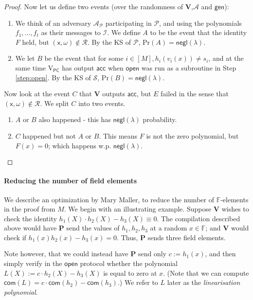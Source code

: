 \documentclass[11pt]{article} %
\newcommand{\F}{\ensuremath{\mathbb F}\xspace}
\newcommand{\adv}{\ensuremath{\mathcal A}\xspace}
\newcommand{\com}{\ensuremath{\mathsf{com}}\xspace}
\newcommand{\open}{\ensuremath{\mathsf{open}}\xspace}
\newcommand{\negl}{\ensuremath{\mathsf{negl}(\lambda)}\xspace}
\newcommand{\acc}{\ensuremath{\mathsf{acc}}\xspace}
\newcommand{\defeq}{:=}
\newcommand{\gen}{\ensuremath{\mathsf{gen}}\xspace}
\newcommand{\prv}{\ensuremath{\mathsf{\mathbf{P}}}\xspace}
\newcommand{\verpc}{\ensuremath{\mathrm{V_{\mathsf{PC}}}}\xspace}
\newcommand{\ideal}{\ensuremath{\mathcal{I}}\xspace}
\newcommand{\inp}{\ensuremath{\mathsf{x}}\xspace}
\newcommand{\wit}{\ensuremath{\omega}\xspace}
\newcommand{\ver}{\ensuremath{\mathsf{\mathbf{V}}}\xspace}
\newcommand{\rel}{\ensuremath{\mathcal{R}}\xspace}
\newcommand{\ext}{\ensuremath{E}\xspace}
\newcommand{\prot}{\ensuremath{\mathscr{P}}\xspace}
\newcommand{\PCscheme}{\ensuremath{\mathscr{S}}\xspace}
\newcommand{\prob}{\ensuremath{\mathrm{Pr}}\xspace}
\newcommand{\advprot}{\ensuremath{\mathcal A_{\prot}}\xspace}
\begin{document}
\begin{proof}
Now let us define two events (over the randomness of \ver,\adv and \gen):
\begin{enumerate}
 \item We think of an adversary \advprot participating in \prot, and using the polynomials $f_1,\ldots,f_t$ as their messages to \ideal. We define $A$ to be the event that the identity $F$ held, but $(\inp,\wit)\notin \rel$. By the KS of \prot, $\prob(A)=\negl$.
 \item We let $B$ be the event that for some $i\in [M], h_i(v_i(x))\neq s_i$, and at the same time \verpc has output \acc when \open was run as a subroutine in Step \ref{step:open}. By the KS of \PCscheme, $\prob(B)=\negl$.
\end{enumerate}

Now look at the event $C$ that \ver outputs \acc, but \ext failed in the sense that $(\inp,\wit)\notin \rel$.
We split $C$ into two events.
\begin{enumerate}
 \item $A$ or $B$ also happened - this has \negl probability.
 \item $C$ happened but not $A$ or $B$. This means $F$ is not the zero polynomial, but $F(x)=0$; which happens w.p. \negl.
\end{enumerate}



\end{proof}



\paragraph{Reducing the number of field elements}
We describe an optimization by Mary Maller, to reduce the number of $\F$-elements in the proof from $M$.
We begin with an illustrating example.
Suppose \ver wishes to check the identity
$h_1(X)\cdot h_2(X) - h_3(X)\equiv 0$.
The compilation described above would have \prv send the values of $h_1,h_2,h_3$ at a random $x\in \F$; and \ver would check if $h_1(x)h_2(x)-h_3(x)=0$.
Thus, \prv sends three field elements.

Note however, that we could instead have \prv send only $c\defeq h_1(x)$,
and then simply verify in the \open protocol whether the polynomial
$L(X)\defeq c\cdot h_2(X) -h_3(X)$ is equal to zero at $x$. (Note that we can compute $\com(L)=c\cdot \com(h_2)-\com(h_3)$.)
We refer to $L$ later as the \emph{linearisation polynomial}.
\end{document}
